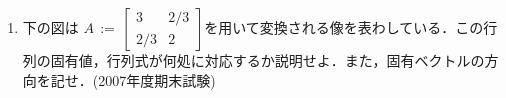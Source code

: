 \begin{enumerate}
\item 下の図は
$A\, := \, \left[ \begin {array}{cc} 3&2/3\\ 2/3&2\end {array} \right]$を用いて変換される像を表わしている．この行列の固有値，行列式が何処に対応するか説明せよ．また，固有ベクトルの方向を記せ．(2007年度期末試験)

\end{enumerate}